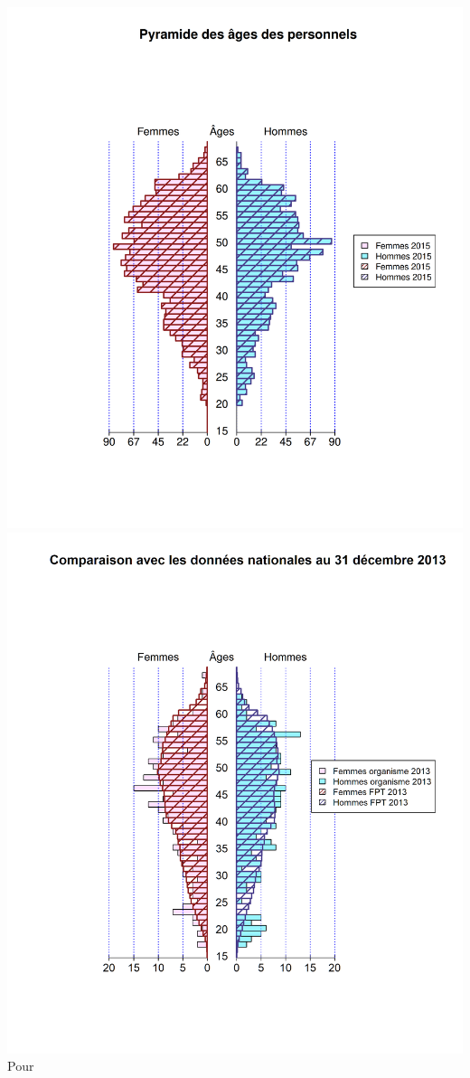 \includegraphics{altair_files/figure-latex/unnamed-chunk-11-1.png}
\includegraphics{altair_files/figure-latex/unnamed-chunk-11-2.png} Pour
